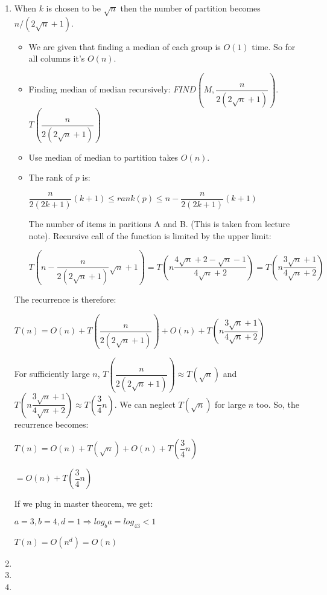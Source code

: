\documentclass{article}
\begin{document}
\begin{enumerate}
\begin{lstlisting}
  \end{lstlisting}
  \item When $k$ is chosen to be $\sqrt{n}$ then the number of partition becomes $n/(2\sqrt{n}+1)$.
  
  \begin{itemize}
    \item We are given that finding a median of each group is $O(1)$ time. So for all columns it's $O(n)$.
    \item Finding median of median recursively: $FIND(M,\dfrac{n}{2(2\sqrt{n}+1)})$. $T(\dfrac{n}{2(2\sqrt{n}+1)})$
    \item Use median of median to partition takes $O(n)$.
    \item The rank of $p$ is:
    \begin{center}
      $\dfrac{n}{2(2k+1)}(k+1)\leq rank(p) \leq n-\dfrac{n}{2(2k+1)}(k+1)$
    \end{center}

    The number of items in paritions A and B. (This is taken from lecture note).
    Recursive call of the function is limited by the upper limit:
    
    \begin{center}
      $T(n-\dfrac{n}{2(2\sqrt{n}+1)}\sqrt{n}+1)=T(n\dfrac{4\sqrt{n}+2-\sqrt{n}-1}{4\sqrt{n}+2})=T(n\dfrac{3\sqrt{n}+1}{4\sqrt{n}+2})$
    \end{center}

  \end{itemize}

  The recurrence is therefore:

  \begin{center}
    $T(n)=O(n)+T(\dfrac{n}{2(2\sqrt{n}+1)})+O(n)+T(n\dfrac{3\sqrt{n}+1}{4\sqrt{n}+2})$
  \end{center}

  For sufficiently large $n$, $T(\dfrac{n}{2(2\sqrt{n}+1)})\approx T(\sqrt{n})$ and $T(n\dfrac{3\sqrt{n}+1}{4\sqrt{n}+2})\approx T(\dfrac{3}{4}n)$.
  We can neglect $T(\sqrt{n})$ for large $n$ too.
  So, the recurrence becomes:

  \begin{center}
    $T(n)=O(n)+T(\sqrt{n})+O(n)+T(\dfrac{3}{4}n)$

    $=O(n)+T(\dfrac{3}{4}n)$
  \end{center}

  If we plug in master theorem, we get:

  $a=3, b=4, d=1 \Rightarrow log_ba=log_43<1$

  \begin{center}
    $T(n)=O(n^d)=O(n)$
  \end{center}
  
  \item 
  \item 
  \item 
\end{enumerate}
\end{document}
